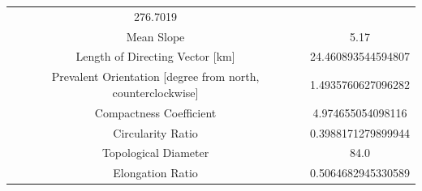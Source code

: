 \documentclass[11pt,]{article}
\begin{document}
\begin{longtable}[]{@{}cc@{}}
\begin{minipage}[t]{0.29\columnwidth}
276.7019\strut
\end{minipage}\tabularnewline
\begin{minipage}[t]{0.65\columnwidth}\centering\strut
Mean Slope\strut
\end{minipage} & \begin{minipage}[t]{0.29\columnwidth}\centering\strut
5.17\strut
\end{minipage}\tabularnewline
\begin{minipage}[t]{0.65\columnwidth}\centering\strut
Length of Directing Vector {[}km{]}\strut
\end{minipage} & \begin{minipage}[t]{0.29\columnwidth}\centering\strut
24.460893544594807\strut
\end{minipage}\tabularnewline
\begin{minipage}[t]{0.65\columnwidth}\centering\strut
Prevalent Orientation {[}degree from north, counterclockwise{]}\strut
\end{minipage} & \begin{minipage}[t]{0.29\columnwidth}\centering\strut
1.4935760627096282\strut
\end{minipage}\tabularnewline
\begin{minipage}[t]{0.65\columnwidth}\centering\strut
Compactness Coefficient\strut
\end{minipage} & \begin{minipage}[t]{0.29\columnwidth}\centering\strut
4.974655054098116\strut
\end{minipage}\tabularnewline
\begin{minipage}[t]{0.65\columnwidth}\centering\strut
Circularity Ratio\strut
\end{minipage} & \begin{minipage}[t]{0.29\columnwidth}\centering\strut
0.3988171279899944\strut
\end{minipage}\tabularnewline
\begin{minipage}[t]{0.65\columnwidth}\centering\strut
Topological Diameter\strut
\end{minipage} & \begin{minipage}[t]{0.29\columnwidth}\centering\strut
84.0\strut
\end{minipage}\tabularnewline
\begin{minipage}[t]{0.65\columnwidth}\centering\strut
Elongation Ratio\strut
\end{minipage} & \begin{minipage}[t]{0.29\columnwidth}\centering\strut
0.5064682945330589\strut
\end{minipage}\tabularnewline

\end{longtable}
\end{document}
